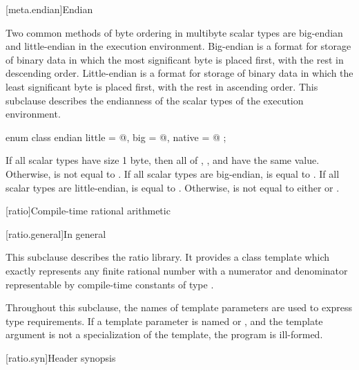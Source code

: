 [meta.endian]{Endian}

\pnum
Two common methods of byte ordering in multibyte scalar types are big-endian
and little-endian in the execution environment. Big-endian is a format for
storage of binary data in which the most significant byte is placed first,
with the rest in descending order. Little-endian is a format for storage of
binary data in which the least significant byte is placed first, with the rest
in ascending order. This subclause describes the endianness of the scalar types
of the execution environment.

%
%
%
%
\begin{itemdecl}
enum class endian {
  little = @\seebelow@,
  big    = @\seebelow@,
  native = @\seebelow@
};
\end{itemdecl}

\begin{itemdescr}
\pnum
If all scalar types have size 1 byte, then all of ,
, and  have the same value.
Otherwise,  is not equal to .
If all scalar types are big-endian,  is
equal to .
If all scalar types are little-endian,  is
equal to .
Otherwise,  is not equal
to either  or .
\end{itemdescr}

[ratio]{Compile-time rational arithmetic}

[ratio.general]{In general}

\pnum
{}%
This subclause describes the ratio library. It provides a class template
 which exactly represents any finite rational number with a
numerator and denominator representable by compile-time constants of type
.

\pnum
Throughout this subclause, the names of template parameters are used to express
type requirements. If a template parameter is named  or ,
and the template argument is not a specialization of the  template,
the program is ill-formed.

[ratio.syn]{Header  synopsis}

